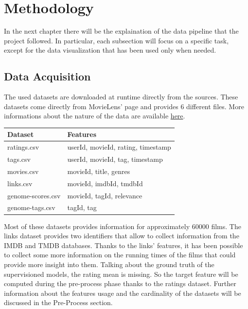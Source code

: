 \documentclass[../main]{subfiles}
\begin{document}
\chapter{Methodology}
In the next chapter there will be the explaination of the data pipeline that the project followed.
In particular, each subsection will focus on a specific task, except for the data visualization that has been used only when needed.

\section{Data Acquisition}
The used datasets are downloaded at runtime directly from the sources.
These datasets come directly from MovieLens' page and provides 6 different files.
More informations about the nature of the data are available \href{https://files.grouplens.org/datasets/movielens/ml-latest-README.html}{here}.
    \begin{table}[h]
        \center
        \begin{tabular}{|l | l|}
        \hline
        \textbf{Dataset} & \textbf{Features} \\
        \hline
        ratings.csv &  userId, movieId, rating, timestamp\\
        \hline
        tags.csv &  userId, movieId, tag, timestamp\\
        \hline
        movies.csv &  movieId, title, genres\\
        \hline
        links.csv &  movieId, imdbId, tmdbId\\
        \hline
        genome-scores.csv &  movieId, tagId, relevance\\
        \hline
        genome-tags.csv & tagId, tag\\
        \hline
        \end{tabular}
    \end{table}
        


Most of these datasets provides information for approximately 60000 films.
The links dataset provides two identifiers that allow to collect information from the IMDB and TMDB databases.
Thanks to the links' features, it has been possible to collect some more information on the running times of the films that could provide more insight into them.
Talking about the ground truth of the supervisioned models, the rating mean is missing. So the target feature will be computed during the pre-process phase thanks to the ratings dataset.
Further information about the features usage and the cardinality of the datasets will be discussed in the Pre-Process section.
\end{document}
